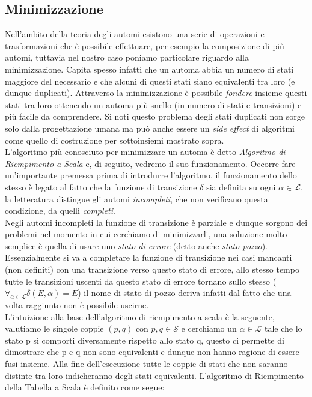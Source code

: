 \subsection{Minimizzazione}
Nell'ambito della teoria degli automi esistono una serie di operazioni e trasformazioni che è possibile effettuare, per esempio la composizione di più automi, tuttavia nel nostro caso poniamo particolare riguardo alla minimizzazione. Capita spesso infatti che un automa abbia un numero di stati maggiore del necessario e che alcuni di questi stati siano equivalenti tra loro (e dunque duplicati). Attraverso la minimizzazione è possibile \emph{fondere} insieme questi stati tra loro ottenendo un automa più snello (in numero di stati e transizioni) e più facile da comprendere. Si noti questo problema degli stati duplicati non sorge solo dalla progettazione umana ma può anche essere un \emph{side effect} di algoritmi come quello di costruzione per sottoinsiemi mostrato sopra.\\
L'algoritmo più conosciuto per minimizzare un automa è detto \emph{Algoritmo di Riempimento a Scala}\cite{Linguaggi_di_Prorgammazione} e, di seguito, vedremo il suo funzionamento. Occorre fare un'importante premessa prima di introdurre l'algoritmo, il funzionamento dello stesso è legato al fatto che la funzione di transizione $\delta$ sia definita su ogni $\alpha \in \mathcal{L}$, la letteratura distingue gli automi \emph{incompleti}, che non verificano questa condizione, da quelli \emph{completi}.\\
Negli automi incompleti la funzione di transizione è parziale e dunque sorgono dei problemi nel momento in cui cerchiamo di minimizzarli, una soluzione molto semplice è quella di usare uno \emph{stato di errore} (detto anche \emph{stato pozzo}). Essenzialmente si va a completare la funzione di transizione nei casi mancanti (non definiti) con una transizione verso questo stato di errore, allo stesso tempo tutte le transizioni uscenti da questo stato di errore tornano sullo stesso ($\forall_{ \alpha \in \mathcal{L}} \delta(E, \alpha) = E$) il nome di stato di pozzo deriva infatti dal fatto che una volta raggiunto non è possibile uscirne.\\
L'intuizione alla base dell'algoritmo di riempimento a scala è la seguente, valutiamo le singole coppie $(p, q)$ con $p, q \in \mathcal{S}$ e cerchiamo un $\alpha \in \mathcal{L}$ tale che lo stato p si comporti diversamente rispetto allo stato q, questo ci permette di dimostrare che p e q non sono equivalenti e dunque non hanno ragione di essere fusi insieme. Alla fine dell'esecuzione tutte le coppie di stati che non saranno distinte tra loro indicheranno degli stati equivalenti. L'algoritmo di Riempimento della Tabella a Scala è definito come segue:
